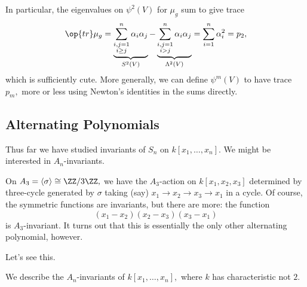 \documentclass[../notes.tex]{subfiles}
\begin{document}
In particular, the eigenvalues on $\psi^2(V)$ for $\mu_g$ sum to give trace
\[\op{tr}\mu_g=\underbrace{\sum_{\substack{i,j=1\\i\ge j}}^n\alpha_i\alpha_j}_{S^2(V)}-\underbrace{\sum_{\substack{i,j=1\\i>j}}^n\alpha_i\alpha_j}_{\Lambda^2(V)}=\sum_{i=1}^n\alpha_i^2=p_2,\]
which is sufficiently cute. More generally, we can define $\psi^m(V)$ to have trace $p_m,$ more or less using Newton's identities in the sums directly.

\subsection{Alternating Polynomials}
Thus far we have studied invariants of $S_n$ on $k[x_1,\ldots,x_n].$ We might be interested in $A_n$-invariants.
\begin{example}
	On $A_3=\langle\sigma\rangle\cong\ZZ/3\ZZ,$ we have the $A_3$-action on $k[x_1,x_2,x_3]$ determined by three-cycle generated by $\sigma$ taking (say) $x_1\to x_2\to x_3\to x_1$ in a cycle. Of course, the symmetric functions are invariants, but there are more: the function
	\[(x_1-x_2)(x_2-x_3)(x_3-x_1)\]
	is $A_3$-invariant. It turns out that this is essentially the only other alternating polynomial, however.
\end{example}
Let's see this.
\begin{exercise}
	We describe the $A_n$-invariants of $k[x_1,\ldots,x_n],$ where $k$ has characteristic not $2.$
\end{exercise}
\end{document}
